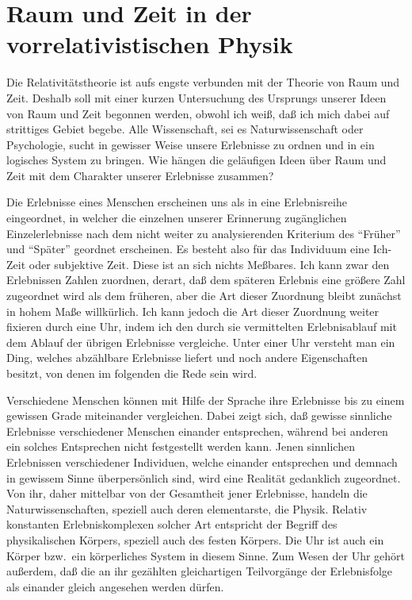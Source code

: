 %
%

\section{Raum und Zeit in der vorrelativistischen Physik}
\label{sec:rau-1}

Die Relativitätstheorie ist aufs engste verbunden mit der Theorie von Raum und 
Zeit. Deshalb soll mit einer kurzen Untersuchung des Ursprungs unserer Ideen von 
Raum und Zeit begonnen werden, obwohl ich weiß, daß ich mich dabei auf 
strittiges Gebiet begebe. Alle Wissenschaft, sei es Naturwissenschaft oder 
Psychologie, sucht in gewisser Weise unsere Erlebnisse zu ordnen und in ein 
logisches System zu bringen. Wie hängen die geläufigen Ideen über Raum und Zeit 
mit dem Charakter unserer Erlebnisse zusammen?

Die Erlebnisse eines Menschen erscheinen uns als in eine Erlebnisreihe 
eingeordnet, in welcher die einzelnen unserer Erinnerung zugänglichen 
Einzelerlebnisse nach dem nicht weiter zu analysierenden Kriterium des 
\enquote{Früher} und \enquote{Später} geordnet erscheinen. Es besteht also für 
das Individuum eine Ich-Zeit oder subjektive Zeit. Diese 
ist an sich nichts Meßbares. Ich kann zwar den Erlebnissen Zahlen zuordnen, 
derart, daß dem späteren Erlebnis eine größere Zahl zugeordnet wird als dem 
früheren, aber die Art dieser Zuordnung bleibt zunächst in hohem Maße 
willkürlich. Ich kann jedoch die Art dieser Zuordnung weiter fixieren durch eine 
Uhr, indem ich den durch sie vermittelten Erlebnisablauf mit dem Ablauf der 
übrigen Erlebnisse vergleiche. Unter einer Uhr versteht man ein Ding, welches 
abzählbare Erlebnisse liefert und noch andere Eigenschaften besitzt, von denen 
im folgenden die Rede sein wird.

Verschiedene Menschen können mit Hilfe der Sprache ihre Erlebnisse bis zu einem 
gewissen Grade miteinander vergleichen. Dabei zeigt sich, daß gewisse sinnliche 
Erlebnisse verschiedener Menschen einander entsprechen, während bei anderen ein 
solches Entsprechen nicht festgestellt werden kann. Jenen sinnlichen Erlebnissen 
verschiedener Individuen, welche einander entsprechen und demnach in gewissem 
Sinne überpersönlich sind, wird eine Realität gedanklich zugeordnet. Von ihr, 
daher mittelbar von der Gesamtheit jener Erlebnisse, handeln die 
Naturwissenschaften, speziell auch deren elementarste, die Physik. Relativ 
konstanten Erlebniskomplexen solcher Art entspricht der Begriff des 
physikalischen Körpers, speziell auch des festen Körpers. Die Uhr ist auch ein 
Körper bzw.\ ein körperliches System in diesem Sinne. Zum Wesen der Uhr gehört 
außerdem, daß die an ihr gezählten gleichartigen Teilvorgänge der Erlebnisfolge 
als einander gleich angesehen werden dürfen.

